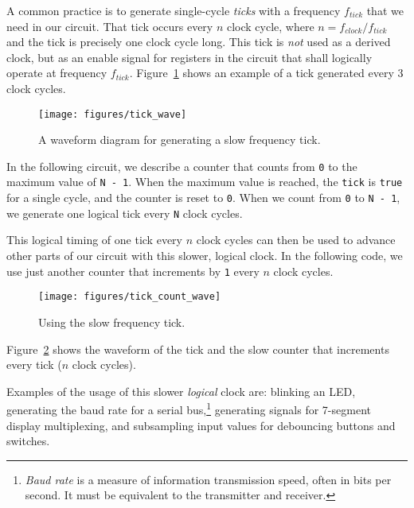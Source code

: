 \documentclass[%
    10pt,
    headinclude, footexclude,
    openright, %
    notitlepage,
    cleardoubleempty,
    headsepline,
    pointlessnumbers,
    bibtotoc, idxtotoc,
    ]{scrbook}
\newcommand{\code}[1]{{\lstinline[basicstyle=\small\ttfamily]{#1}}}
\begin{document}
A common practice is to generate single-cycle \emph{ticks} with a frequency $f_{tick}$
that we need in our circuit. That tick occurs every $n$ clock cycle,
where $n = f_{clock}/f_{tick}$ and the tick is precisely one clock cycle long.
This tick is \emph{not} used as a derived clock, but as an enable signal for
registers in the circuit that shall logically operate at frequency $f_{tick}$.
Figure~\ref{fig:tick-wave} shows an example of a tick generated every
3 clock cycles.

\begin{figure}
  \centering
  \texttt{[image: figures/tick\_wave]}
  \caption{A waveform diagram for generating a slow frequency tick.}
  \label{fig:tick-wave}
\end{figure}

In the following circuit, we describe a counter that counts from \code{0}
to the maximum value of \code{N - 1}. When the maximum value is reached,
the \code{tick} is \code{true} for a single cycle, and the counter is reset to \code{0}.
When we count from \code{0} to \code{N - 1}, we generate one logical tick
every \code{N} clock cycles.


\noindent This logical timing of one tick every $n$ clock cycles can then be used
to advance other parts of our circuit with this slower, logical clock.
In the following code, we use just another counter that increments by \code{1}
every $n$ clock cycles.


\begin{figure}
  \centering
  \texttt{[image: figures/tick\_count\_wave]}
  \caption{Using the slow frequency tick.}
  \label{fig:tick-count-wave}
\end{figure}

\noindent Figure~\ref{fig:tick-count-wave} shows the waveform of the tick and the
slow counter that increments every tick ($n$ clock cycles).

Examples of the usage of this slower \emph{logical} clock are: blinking an LED,
generating the baud rate for a serial bus,\footnote{\textit{Baud rate} is a measure of
information transmission speed, often in bits per second. It must be equivalent to 
the transmitter and receiver.} generating signals for 7-segment
display multiplexing, and subsampling input values for debouncing buttons
and switches.
\end{document}
